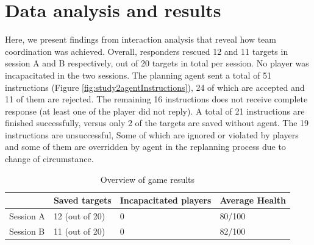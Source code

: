 
\section{Data analysis and results}
Here, we present findings from interaction analysis that reveal how team coordination was achieved. Overall, responders rescued 12 and 11 targets in session A and B respectively, out of 20 targets in total per session. No player was incapacitated in the two sessions. The planning agent sent a total of 51 instructions (Figure \ref{fig:study2agentInstructions}), 24 of which are accepted and 11 of them are rejected. The remaining 16 instructions does not receive complete response (at least one of the player did not reply). A total of 21 instructions are finished successfully, versus only 2 of the targets are saved without agent. The 19 instructions are unsuccessful, Some of which are ignored or violated by players and some of them are overridden by agent in the replanning process due to change of circumstance.\\

\begin{table}[h]
\footnotesize
\begin{tabular}{llll}
\multicolumn{1}{l|}{} & Saved targets & Incapacitated players & Average Health \\ \hline
\multicolumn{1}{l|}{Session A} & 12 (out of 20) & 0                    & 80/100             \\ 
\multicolumn{1}{l|}{Session B} & 11 (out of 20) & 0                    & 82/100             \\ 
\end{tabular}
\caption{Overview of game results}
\label{tab:gameResults1}
\end{table}


